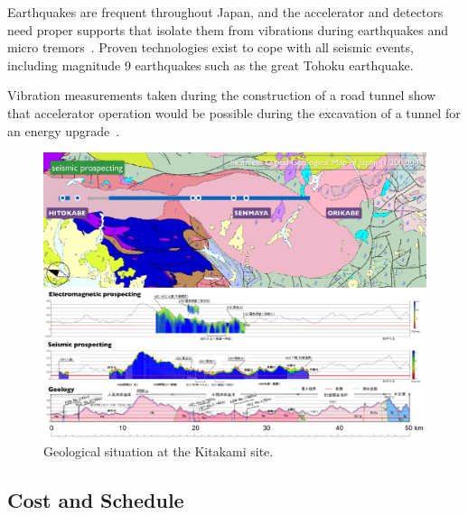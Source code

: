 Earthquakes are frequent throughout Japan, and the accelerator and detectors need  proper supports that isolate them from vibrations during earthquakes and micro tremors~\cite{Sanuki:2018b}. 
Proven technologies exist to cope with all seismic events, including magnitude 9 earthquakes such as the great Tohoku earthquake. 


Vibration measurements taken during the construction of a road tunnel show that accelerator operation would be possible during the excavation of a tunnel for an energy upgrade~\cite{Sanuki:2018a}.



\begin{figure}[htbp]
   \includegraphics[width=\hsize]{chapters/figures/Kitakami_Geology}
\caption{Geological situation at the Kitakami site.}
\label{fig:kitakami-geology}
\end{figure}



\subsection{Cost and Schedule}

